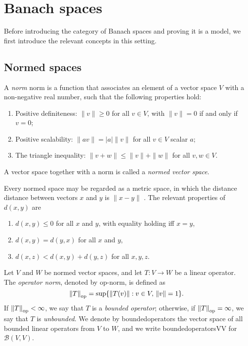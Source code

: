 \section{Banach spaces}

Before introducing the category of Banach spaces and proving it is a model, we first introduce the relevant concepts in this setting. 




\subsection{Normed spaces}

\begin{definition} \label{def:norm}
  A \emph{norm} \gls{norm} is a function that associates an element of a vector space $V$ with a non-negative real number, such that the following properties hold:
  \begin{enumerate}
    \item Positive definiteness: $\|v\| \geq 0$ for all $v \in V$, with $\|v\| = 0$ if and only if $v = 0$;
    \item Positive scalability: $\|av\| = |a|\|v\|$ for all $v \in V$ scalar $a$;
    \item The triangle inequality: $\|v + w\| \leq \|v\| + \|w\|$ for all $v, w \in V$.
  \end{enumerate}
\end{definition}

\begin{definition} \label{def:normed_space}
A vector space together with a norm is called a \emph{normed vector space}.
\end{definition}


Every normed space may be regarded as a metric space, in which the
distance \gls{distance} between vectors $x$ and $y$ is $\|x-y\|$ . The relevant properties of $d(x,y)$ are

\begin{enumerate}
  \item $ d(x, y) \leq 0 $ for all $x$ and $y$, with equality holding iff $x = y$,
  \item $d(x, y) = d(y, x)$ for all $x$ and $y$,
  \item $d(x, z) < d(x, y) + d(y, z)$ for all $x, y, z$.
\end{enumerate}

\begin{definition} \label{def:op_norm}
Let \( V \) and \( W \) be normed vector spaces, and let \( T: V \rightarrow W \) be a linear operator. The \emph{operator norm}, denoted by \gls{op-norm}, is defined as
\[
\left\lVert T \right\rVert_{\text{op}} = \sup \{ \left\lVert T(v) \right\rVert : v \in V, \, \left\lVert v \right\rVert = 1 \}.
\]
If \( \left\lVert T \right\rVert_{\text{op}} < \infty \), we say that \( T \) is a \emph{bounded operator}; otherwise, if \( \left\lVert T \right\rVert_{\text{op}} = \infty \), we say that \( T \) is \emph{unbounded}. We denote by \gls{boundedoperators} the vector space of all bounded linear operators from \( V \) to \( W \), and we write  \gls{boundedoperatorsVV} for \( \mathcal{B}(V, V) \).
\end{definition}

